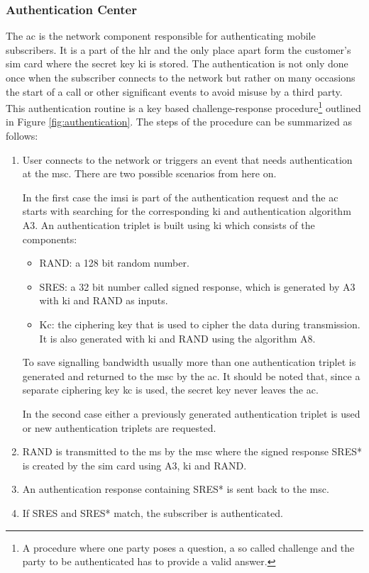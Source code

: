\subsubsection{Authentication Center}
\label{sec:authentication}
The \gls{ac} is the network component responsible for authenticating mobile subscribers.
It is a part of the \gls{hlr} and the only place apart form the customer's \gls{sim} card where the secret key \gls{ki} is stored.
The authentication is not only done once when the subscriber connects to the network but rather on many occasions \eg the start of a call or other significant events to avoid misuse by a third party.
This authentication routine is a key based challenge-response procedure\footnote{A procedure where one party poses a question, a so called challenge and the party to be authenticated has to provide a valid answer.} outlined in Figure \ref{fig:authentication}.
The steps of the procedure can be summarized as follows:
\begin{enumerate}
	\item User connects to the network or triggers an event that needs authentication at the \gls{msc}.
	There are two possible scenarios from here on.
 	
 	In the first case the \gls{imsi} is part of the authentication request and the \gls{ac} starts with searching for the corresponding \gls{ki} and authentication algorithm A3.
	An authentication triplet is built using \gls{ki} which consists of the components:
	\begin{itemize}
		\item RAND: a 128 bit random number.
		\item SRES: a 32 bit number called signed response, which is generated by A3 with \gls{ki} and RAND as inputs.
		\item Kc: the ciphering key that is used to cipher the data during transmission.
		It is also generated with \gls{ki} and RAND using the algorithm A8.
	\end{itemize}
	To save signalling bandwidth usually more than one authentication triplet is generated and returned to the \gls{msc} by the \gls{ac}.
	It should be noted that, since a separate ciphering key \gls{kc} is used, the secret key never leaves the \gls{ac}.
	
	In the second case either a previously generated authentication triplet is used or new authentication triplets are requested.
	\item RAND is transmitted to the \gls{ms} by the \gls{msc} where the signed response SRES* is created by the \gls{sim} card using A3, \gls{ki} and RAND.
	
	\item An authentication response containing SRES* is sent back to the \gls{msc}.
	
	\item If SRES and SRES* match, the subscriber is authenticated.
\end{enumerate}

